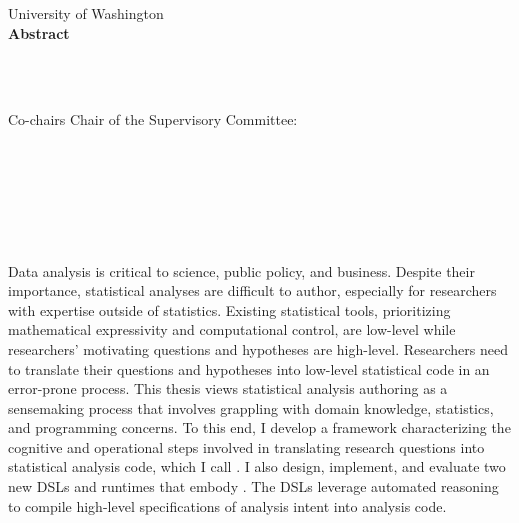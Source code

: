 
\thispagestyle{empty}
\begin{centering}
\vspace{1in}
University of Washington \\
\vspace*{1.\baselineskip}
{\bf Abstract}\\
\vspace*{1\baselineskip}

{\thesisTitle}\\ %
\vspace*{1.\baselineskip}
{\authorName} \\ %
\vspace*{1.\baselineskip}


\ifdefined\secondAdvisor
    Co-chairs
    \else
    Chair
\fi
of the Supervisory Committee:\\ %
\advisorTitle~\advisor\\ \vspace{-.5em} \advisorDepartment \\
\ifdefined\secondAdvisor
    \secondAdvisorTitle~\secondAdvisor\\\vspace{-.5em}\secondAdvisorDepartment \\
\fi
\end{centering}
\vspace*{\baselineskip}

 \\ 
 \\

Data analysis is critical to science, public policy, and business. Despite their
importance, statistical analyses are difficult to author, especially for
researchers with expertise outside of statistics. Existing statistical tools,
prioritizing mathematical expressivity and computational control, are low-level
while researchers' motivating questions and hypotheses are high-level.
Researchers need to translate their questions and hypotheses into low-level
statistical code in an error-prone process. 
This thesis views statistical analysis authoring as a sensemaking process that
involves grappling with domain knowledge, statistics, and programming concerns.
To this end, I develop a framework characterizing the cognitive and operational
steps involved in translating research questions into statistical analysis code,
which I call \hypoForm. I also design, implement, and evaluate two new DSLs and
runtimes that embody \hypoForm. The DSLs leverage automated reasoning to compile
high-level specifications of analysis intent into analysis code.

